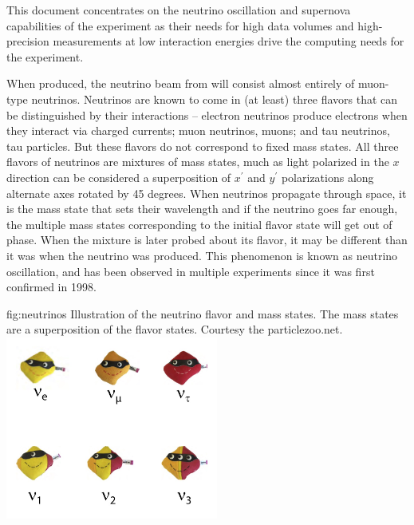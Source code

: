 \documentclass[../main-v1.tex]{subfiles}
\begin{document}
This document  concentrates on the neutrino oscillation and supernova capabilities of the experiment as their needs for high data volumes and high-precision measurements at low interaction energies drive the computing needs for the experiment. 



When produced, the neutrino beam from  will consist almost entirely of muon-type neutrinos. %
Neutrinos are known to come in (at least) three flavors that can be distinguished by their interactions -- electron %
neutrinos produce electrons when they interact via charged currents; muon neutrinos, muons; and tau neutrinos, tau particles.  But these flavors do not correspond to fixed mass states.  All three flavors of neutrinos are mixtures of mass states, much as  light polarized in the $x$ direction  can be considered a superposition of  $x^\prime$ and $y^\prime$ polarizations along  alternate axes rotated by 45 degrees.  When neutrinos propagate through space, it is the mass state that sets their wavelength and if the neutrino goes far enough, the multiple mass states  corresponding to the initial flavor state will get out of phase.  When the mixture is later probed about its flavor, it may be different than it was when the neutrino was produced. %
This phenomenon is known as neutrino oscillation, and has been %
observed in multiple experiments since it was first confirmed in 1998\cite{Kajita2006}.


\begin{dunefigure}
{fig:neutrinos}
{Illustration of the neutrino flavor and mass states.  The mass states are a superposition of the flavor states.  Courtesy the particlezoo.net.}
\includegraphics[height=6cm]{graphics/IntroFigures/Fig_01_neutrinos.jpg}
\end{dunefigure}
\end{document}
